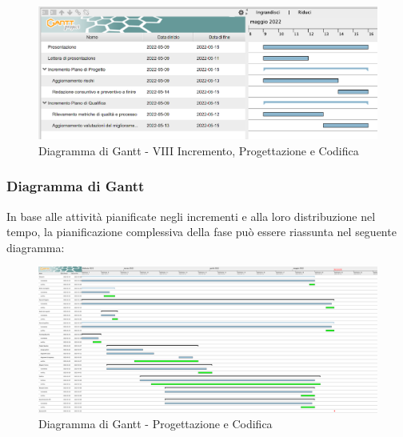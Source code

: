 \begin{figure}[H]
	\centering
	\includegraphics[scale=0.45]{Sezioni/gantt/VIII_incremento.png}
	\caption{Diagramma di Gantt - VIII Incremento, Progettazione e Codifica}
\end{figure}

\pagebreak

\subsubsection{Diagramma di Gantt}
In base alle attività pianificate negli incrementi e alla loro distribuzione nel tempo, la pianificazione complessiva della fase può essere riassunta nel seguente diagramma:
\begin{figure}[H]
    \centerfloat
	\includegraphics[width=1.3\textwidth, height=0.5\textheight, angle=90 ]{Sezioni/gantt/progettazione_codifica.png}
	\caption{Diagramma di Gantt - Progettazione e Codifica}
\end{figure}

